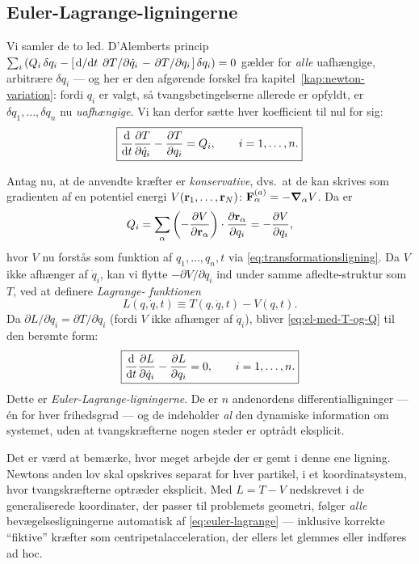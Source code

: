 \subsection{Euler-Lagrange-ligningerne}

Vi samler de to led. D'Alemberts princip
$\sum_i\left(Q_i\,\delta q_i - \left[\dv*{}{t}\pdv*{T}{\dot q_i} - \pdv*{T}{q_i}\right]\delta q_i\right)=0$
gælder for \emph{alle} uafhængige, arbitrære $\delta q_i$ — og her er
den afgørende forskel fra kapitel~\ref{kap:newton-variation}: fordi
$q_i$ er valgt, så tvangsbetingelserne allerede er opfyldt, er
$\delta q_1,\dots,\delta q_n$ nu \emph{uafhængige}. Vi kan derfor sætte
hver koefficient til nul for sig:
\begin{equation}
  \boxed{\dv{t}\pdv{T}{\dot q_i} - \pdv{T}{q_i} = Q_i, \qquad i=1,\dots,n.}
  \label{eq:el-med-T-og-Q}
\end{equation}

Antag nu, at de anvendte kræfter er \emph{konservative}, dvs.\ at de
kan skrives som gradienten af en potentiel energi $V(\vb{r}_1,\dots,\vb{r}_N)$:
$\vb{F}_\alpha^{(a)} = -\grad_\alpha V$. Da er
\begin{equation}
  Q_i = \sum_\alpha \left(-\pdv{V}{\vb{r}_\alpha}\right)\cdot\pdv{\vb{r}_\alpha}{q_i}
      = -\pdv{V}{q_i},
\end{equation}
hvor $V$ nu forstås som funktion af $q_1,\dots,q_n,t$ via
\eqref{eq:transformationsligning}. Da $V$ ikke afhænger af
$\dot q_i$, kan vi flytte $-\partial V/\partial q_i$ ind under samme
afledte-struktur som $T$, ved at definere \emph{Lagrange-
funktionen}
\begin{equation}
  \boxed{L(q,\dot q,t) \equiv T(q,\dot q,t) - V(q,t).}
  \label{eq:def-L}
\end{equation}
Da $\partial L/\partial \dot q_i = \partial T/\partial \dot q_i$ (fordi
$V$ ikke afhænger af $\dot q_i$), bliver \eqref{eq:el-med-T-og-Q} til
den berømte form:
\begin{equation}
  \boxed{\dv{t}\pdv{L}{\dot q_i} - \pdv{L}{q_i} = 0, \qquad i=1,\dots,n.}
  \label{eq:euler-lagrange}
\end{equation}
Dette er \emph{Euler-Lagrange-ligningerne}. De er $n$ andenordens
differentialligninger — én for hver frihedsgrad — og de indeholder
\emph{al} den dynamiske information om systemet, uden at
tvangskræfterne nogen steder er optrådt eksplicit.

\begin{bemaerkning}
Det er værd at bemærke, hvor meget arbejde der er gemt i denne ene
ligning. Newtons anden lov skal opskrives separat for hver partikel, i
et koordinatsystem, hvor tvangskræfterne optræder eksplicit. Med
$L=T-V$ nedskrevet i de generaliserede koordinater, der passer til
problemets geometri, følger \emph{alle} bevægelsesligningerne
automatisk af \eqref{eq:euler-lagrange} — inklusive korrekte ``fiktive''
kræfter som centripetalacceleration, der ellers let glemmes eller
indføres ad hoc.
\end{bemaerkning}

